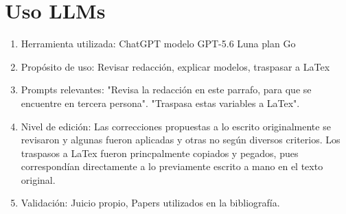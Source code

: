 \documentclass[letter, 10pt]{article}
\begin{document}
\section{Uso LLMs}
\begin{enumerate}
\item Herramienta utilizada: ChatGPT modelo GPT-5.6 Luna plan Go
\item Prop\'osito de uso: Revisar redacci\'on, explicar modelos, traspasar a LaTex
\item Prompts relevantes: "Revisa la redacci\'on en este parrafo, para que se encuentre en tercera persona". "Traspasa estas variables a LaTex". 
\item Nivel de edici\'on: Las correcciones propuestas a lo escrito originalmente se revisaron y algunas fueron aplicadas y otras no seg\'un diversos criterios. Los traspasos a LaTex fueron princpalmente copiados y pegados, pues correspond\'ian directamente a lo previamente escrito a mano en el texto original. 
\item Validaci\'on: Juicio propio, Papers utilizados en la bibliograf\'ia.
\end{enumerate}




\end{document}
